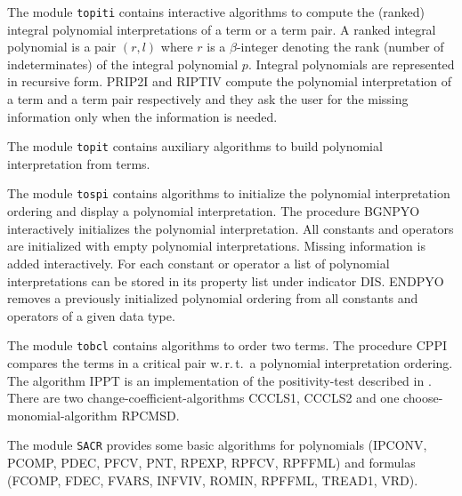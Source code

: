 The module {\tt topiti} contains interactive algorithms to compute the
(ranked) integral polynomial interpretations of a term or a term pair.
A ranked integral polynomial is a pair $(r,l)$ where $r$ is a $\beta$-integer
denoting the rank (number of indeterminates) of the integral polynomial $p$.
Integral polynomials are represented in recursive form.
PRIP2I and RIPTIV compute the polynomial interpretation of a term and a term
pair respectively and they ask the user for the missing information only
when the information is needed.

The module {\tt topit} contains auxiliary algorithms to build
polynomial interpretation from terms.

The module {\tt tospi} contains algorithms to initialize the
polynomial interpretation ordering and display a polynomial
interpretation. 
The procedure BGNPYO interactively initializes the
polynomial interpretation. All constants and operators are initialized
with empty polynomial interpretations. Missing information is added
interactively. 
For each constant or operator a list of polynomial interpretations
can be stored in its property list under indicator DIS.
ENDPYO removes a previously initialized polynomial
ordering from all constants and operators of a given data type.

The module {\tt tobcl} contains algorithms to order two terms.
The procedure CPPI compares the terms in a critical pair w.\,r.\,t.\ a 
polynomial interpretation ordering. The algorithm IPPT is an
implementation of the positivity-test described in 
\cite{BenCherifaLescanne:87}.
There are two change-coefficient-algorithms CCCLS1, CCCLS2 and one
choose-monomial-algorithm RPCMSD.

The module {\tt SACR} provides some basic algorithms for  polynomials
(IPCONV, PCOMP, PDEC, PFCV, PNT, RPEXP, RPFCV, RPFFML)
and formulas (FCOMP, FDEC, FVARS, INFVIV, ROMIN, RPFFML, TREAD1, VRD).

